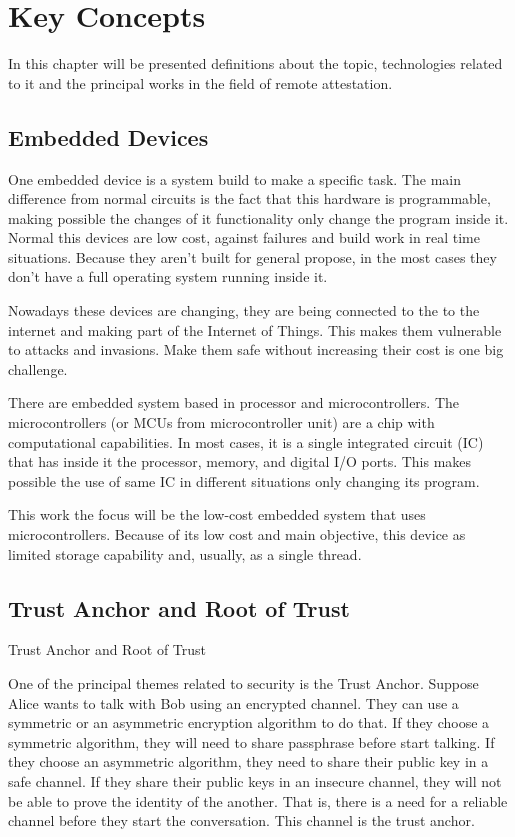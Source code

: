 \chapter{Key Concepts}

In this chapter will be presented definitions about the topic, technologies related to it and the principal works in the field of remote attestation. 

\section{Embedded Devices}

One embedded device is a system build to make a specific task. The main difference from normal circuits is the fact that this hardware is programmable, making possible the changes of it functionality only change the program inside it. Normal this devices are low cost, against failures and build work in real time situations. Because they aren't built for general propose, in the most cases they don't have a full operating system running inside it.

Nowadays these devices are changing, they are being connected to the to the internet and making part of the Internet of Things. This makes them vulnerable to attacks and invasions. Make them safe without increasing their cost is one big challenge.

There are embedded system based in processor and microcontrollers.  The microcontrollers (or MCUs from microcontroller unit) are a chip with computational capabilities. In most cases, it is a single integrated circuit (IC) that has inside it the processor, memory, and digital I/O ports. This makes possible the use of same IC in different situations only changing its program. 

This work the focus will be the low-cost embedded system that uses microcontrollers.  Because of its low cost and main objective, this device as limited storage capability and, usually, as a single thread. 

\section{Trust Anchor and Root of Trust}

Trust Anchor and Root of Trust

One of the principal themes related to security is the Trust Anchor. Suppose Alice wants to talk with Bob using an encrypted channel. They can use a symmetric or an asymmetric encryption algorithm to do that. If they choose a symmetric algorithm, they will need to share passphrase before start talking. If they choose an asymmetric algorithm, they need to share their public key in a safe channel. If they share their public keys in an insecure channel, they will not be able to prove the identity of the another. That is, there is a need for a reliable channel before they start the conversation. This channel is the trust anchor.

